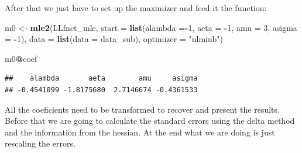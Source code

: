 \documentclass[]{book}
\newenvironment{Shaded}{\begin{snugshade}}{\end{snugshade}}
\newcommand{\KeywordTok}[1]{\textcolor[rgb]{0.13,0.29,0.53}{\textbf{#1}}}
\newcommand{\DataTypeTok}[1]{\textcolor[rgb]{0.13,0.29,0.53}{#1}}
\newcommand{\DecValTok}[1]{\textcolor[rgb]{0.00,0.00,0.81}{#1}}
\newcommand{\StringTok}[1]{\textcolor[rgb]{0.31,0.60,0.02}{#1}}
\newcommand{\OperatorTok}[1]{\textcolor[rgb]{0.81,0.36,0.00}{\textbf{#1}}}
\newcommand{\NormalTok}[1]{#1}
\begin{document}
After that we just have to set up the maximizer and feed it the
function:

\begin{Shaded}
\begin{Highlighting}[]
\NormalTok{m0 <-}\StringTok{ }\KeywordTok{mle2}\NormalTok{(LLfnct_mle, }
           \DataTypeTok{start =} \KeywordTok{list}\NormalTok{(}\DataTypeTok{alambda =}\OperatorTok{-}\DecValTok{1}\NormalTok{,}
                        \DataTypeTok{aeta =} \OperatorTok{-}\DecValTok{1}\NormalTok{, }
                        \DataTypeTok{amu =} \DecValTok{3}\NormalTok{,}
                        \DataTypeTok{asigma =} \OperatorTok{-}\DecValTok{1}\NormalTok{), }
           \DataTypeTok{data =} \KeywordTok{list}\NormalTok{(}\DataTypeTok{data =}\NormalTok{ data_sub),}
           \DataTypeTok{optimizer =} \StringTok{"nlminb"}\NormalTok{)}

\NormalTok{m0}\OperatorTok{@}\NormalTok{coef}
\end{Highlighting}
\end{Shaded}

\begin{verbatim}
##    alambda       aeta        amu     asigma 
## -0.4541099 -1.8175680  2.7146674 -0.4361533
\end{verbatim}

All the coeficients need to be transformed to recover and present the
results. Before that we are going to calculate the standard errors using
the delta method and the information from the hessian. At the end what
we are doing is just rescaling the errors.

\begin{Shaded}
\end{Shaded}
\end{document}
